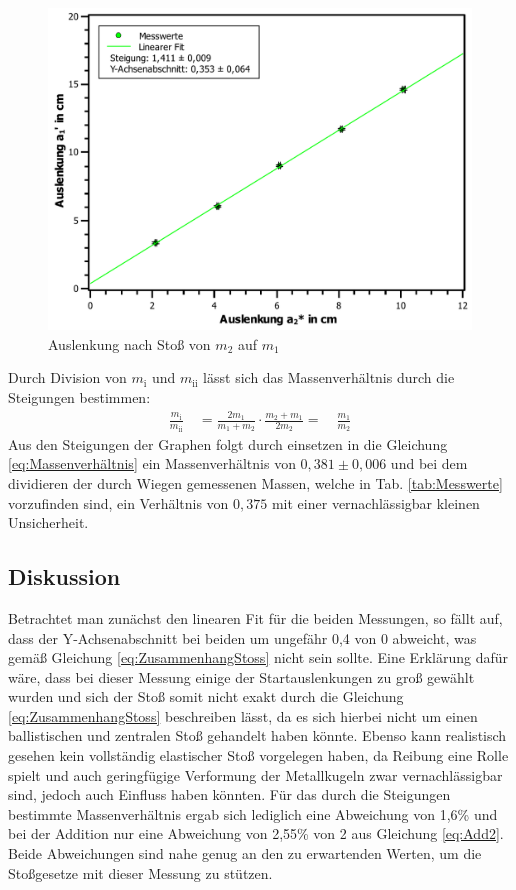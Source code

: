 			\begin{figure}[ht]
				\centering
				\includegraphics[width=\textwidth]{AuslenkungGross.pdf}
				\caption{Auslenkung nach Stoß von $m_2$ auf $m_1$}
				\label{abb:AuslenkungGross}	
			\end{figure}
		
			Durch Division von $m_\text{i}$ und $m_\text{ii}$ lässt sich das Massenverhältnis durch die Steigungen bestimmen:
			\begin{align}
				\frac{m_\text{i}}{m_\text{ii}} \quad = \frac{2m_\text{1}}{m_\text{1}+m_\text{2}} \cdot \frac{m_\text{2}+m_\text{1}}{2m_\text{2}}
				= \quad  \frac{m_\text{1}}{m_\text{2}} \label{eq:Massenverhältnis}
			\end{align}
			Aus den Steigungen der Graphen folgt durch einsetzen in die Gleichung \ref{eq:Massenverhältnis} ein Massenverhältnis von $0,381 \pm 0,006$ und bei dem dividieren der durch Wiegen gemessenen Massen, welche in Tab. \ref{tab:Messwerte} vorzufinden sind, ein Verhältnis von $0,375$ mit einer vernachlässigbar kleinen Unsicherheit.
			
	\subsection{Diskussion}
		
		Betrachtet man zunächst den linearen Fit für die beiden Messungen, so fällt auf, dass der Y-Achsenabschnitt bei beiden um ungefähr 0,4 von 0 abweicht, was gemäß Gleichung \ref{eq:ZusammenhangStoss} nicht sein sollte. Eine Erklärung dafür wäre, dass bei dieser Messung einige der Startauslenkungen zu groß gewählt wurden und sich der Stoß somit nicht exakt durch die Gleichung \ref{eq:ZusammenhangStoss} beschreiben lässt, da es sich hierbei nicht um einen ballistischen und zentralen Stoß gehandelt haben könnte. Ebenso kann realistisch gesehen kein vollständig elastischer Stoß vorgelegen haben, da Reibung eine Rolle spielt und auch geringfügige Verformung der Metallkugeln zwar vernachlässigbar sind, jedoch auch Einfluss haben könnten.
		Für das durch die Steigungen bestimmte Massenverhältnis ergab sich lediglich eine Abweichung von 1,6\% und bei der Addition nur eine Abweichung von 2,55\% von 2 aus Gleichung \ref{eq:Add2}. Beide Abweichungen sind nahe genug an den zu erwartenden Werten, um die Stoßgesetze mit dieser Messung zu stützen. 
		
